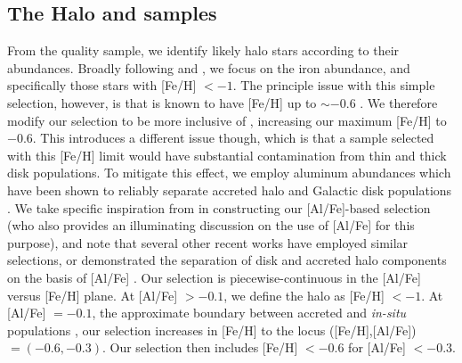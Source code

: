 \subsection{The Halo and \gse samples}
\label{ch3:subsec:halo-gse-samples}

From the quality sample, we identify likely halo stars according to their abundances. Broadly following \cite{mackereth20} and \cite{lane22}, we focus on the iron abundance, and specifically those stars with [Fe/H] $< -1$. The principle issue with this simple selection, however, is that \gse is known to have [Fe/H] up to $\sim -0.6$ \parencite[e.g.][]{myeong19,monty20,hasselquist21,horta23a}. We therefore modify our selection to be more inclusive of \gse, increasing our maximum [Fe/H] to $-0.6$. This introduces a different issue though, which is that a sample selected with this [Fe/H] limit would have substantial contamination from thin and thick disk populations. To mitigate this effect, we employ aluminum abundances which have been shown to reliably separate accreted halo and Galactic disk populations \parencite{hawkins15}. We take specific inspiration from \textcite{belokurov22} in constructing our [Al/Fe]-based selection (who also provides an illuminating discussion on the use of [Al/Fe] for this purpose), and note that several other recent works have employed similar selections, or demonstrated the separation of disk and accreted halo components on the basis of [Al/Fe] \parencite{das20,hasselquist21,horta23a}. Our selection is piecewise-continuous in the [Al/Fe] versus [Fe/H] plane. At [Al/Fe] $> -0.1$, we define the halo as [Fe/H] $< -1$. At [Al/Fe] $= -0.1$, the approximate boundary between accreted and \textit{in-situ} populations \parencite{hawkins15,das20,hasselquist21}, our selection increases in [Fe/H] to the locus ([Fe/H],[Al/Fe]) $= (-0.6,-0.3)$. Our selection then includes [Fe/H] $< -0.6$ for [Al/Fe] $< -0.3$.

